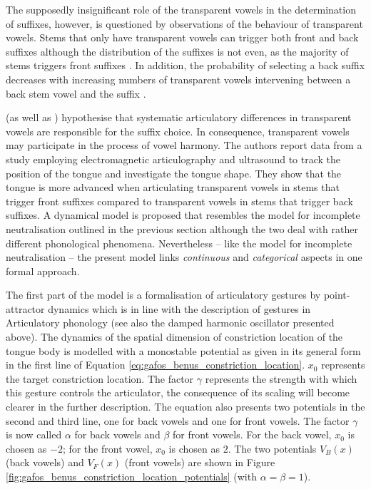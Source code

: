 The supposedly insignificant role of the transparent vowels in the determination of suffixes, however, is questioned by observations of the behaviour of transparent vowels. Stems that only have transparent vowels can trigger both front and back suffixes \citep{Vago1980, GafosBenus2006} although the distribution of the suffixes is not even, as the majority of stems triggers front suffixes \citep{HayesLonde2006, GafosBenus2006}. In addition, the probability of selecting a back suffix decreases with increasing numbers of transparent vowels intervening between a back stem vowel and the suffix \citep{GafosBenus2006}.

\citet{GafosBenus2006} (as well as \citealp{Benus2005}) hypothesise that systematic articulatory differences in transparent vowels are responsible for the suffix choice. In consequence, transparent vowels may participate in the process of vowel harmony. The authors report data from a study employing electromagnetic articulography and ultrasound to track the position of the tongue and investigate the tongue shape. They show that the tongue is more advanced when articulating transparent vowels in stems that trigger front suffixes compared to transparent vowels in stems that trigger back suffixes. A dynamical model is proposed that resembles the model for incomplete neutralisation outlined in the previous section although the two deal with rather different phonological phenomena. Nevertheless -- like the model for incomplete neutralisation -- the present model links \emph{continuous} and \emph{categorical} aspects in one formal approach.

The first part of the model is a formalisation of articulatory gestures by point-attractor dynamics which is in line with the description of gestures in Articulatory phonology (see also the damped harmonic oscillator presented above). The dynamics of the spatial dimension of constriction location of the tongue body is modelled with a monostable potential as given in its general form in the first line of Equation \ref{eq:gafos_benus_constriction_location}. $x_0$ represents the target constriction location. The factor $\gamma$ represents the strength with which this gesture controls the articulator, the consequence of its scaling will become clearer in the further description. The equation also presents two potentials in the second and third line, one for back vowels and one for front vowels. The factor $\gamma$ is now called $\alpha$ for back vowels and $\beta$ for front vowels. For the back vowel, $x_0$ is chosen as $-2$; for the front vowel, $x_0$ is chosen as $2$. The two potentials $V_B(x)$ (back vowels) and $V_F(x)$ (front vowels) are shown in Figure \ref{fig:gafos_benus_constriction_location_potentials} (with $\alpha = \beta = 1$). 

